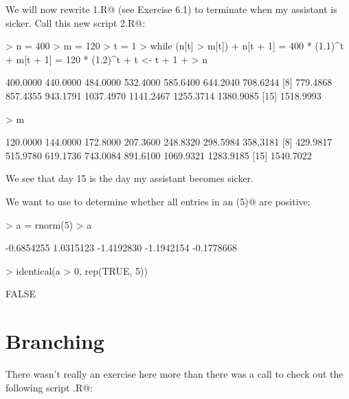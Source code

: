 \documentclass[11pt, oneside, reqno]{article}
\begin{document}
\eans

We will now rewrite \verb@Parasite1.R@ (see Exercise 6.1) to terminate when my assistant is sicker. Call this new script \verb@Parasite2.R@:

\begin{Schunk}
\begin{Sinput}
> n = 400
> m = 120
> t = 1
> while (n[t] > m[t]) {
+     n[t + 1] = 400 * (1.1)^t
+     m[t + 1] = 120 * (1.2)^t
+     t <- t + 1
+ }
> n
\end{Sinput}
\begin{Soutput}
 [1]  400.0000  440.0000  484.0000  532.4000  585.6400  644.2040  708.6244
 [8]  779.4868  857.4355  943.1791 1037.4970 1141.2467 1255.3714 1380.9085
[15] 1518.9993
\end{Soutput}
\begin{Sinput}
> m
\end{Sinput}
\begin{Soutput}
 [1]  120.0000  144.0000  172.8000  207.3600  248.8320  298.5984  358.3181
 [8]  429.9817  515.9780  619.1736  743.0084  891.6100 1069.9321 1283.9185
[15] 1540.7022
\end{Soutput}
\end{Schunk}

We see that day 15 is the day my assistant becomes sicker.
\eans

We want to use \verb@identical@ to determine whether all entries in an \verb@rnorm(5)@ are positive:
\begin{Schunk}
\begin{Sinput}
> a = rnorm(5)
> a
\end{Sinput}
\begin{Soutput}
[1] -0.6854255  1.0315123 -1.4192830 -1.1942154 -0.1778668
\end{Soutput}
\begin{Sinput}
> identical(a > 0, rep(TRUE, 5))
\end{Sinput}
\begin{Soutput}
[1] FALSE
\end{Soutput}
\end{Schunk}
\eans

\section{Branching}

There wasn't really an exercise here more than there was a call to check out the following script \verb@Branch.R@:
\end{document}
